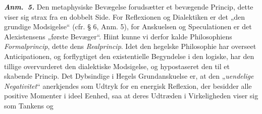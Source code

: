 \documentclass[12pt]{book}
\newcommand{\anm}[1]{\emph{\textbf{Anm.~#1.}}}
\newcommand{\opage}[1]{\marginnote{\footnotesize\textit{[#1]}}}
\begin{document}
\anm{5} Den metaphysiske Bevægelse forudsætter et bevægende Princip, dette viser sig
strax fra en dobbelt Side. For Reflexionen og Dialektiken er det „den grundige
Modsigelse“ (cfr. § 6, Anm. 5), for Anskuelsen og Speculationen er det Alexistensens
„første Bevæger“. Hiint kunne vi derfor kalde Philosophiens \emph{Formalprincip},
dette dens \emph{Realprincip}. Idet den hegelske Philosophie har overseet
Anticipationen, og forflygtiget den existentielle Begyndelse i den logiske, har den
tillige overvurderet den dialektiske Modsigelse, og hypostaseret den til et skabende
Princip. Det Dybsindige i Hegels Grundanskuelse er, at den „\emph{uendelige
Negativitet}“ anerkjendes som Udtryk for en energisk Reflexion, der besidder alle
positive Momenter i ideel Eenhed, saa at deres Udtræden i Virkeligheden viser sig som
Tankens og
\opage{111} %
\end{document}
